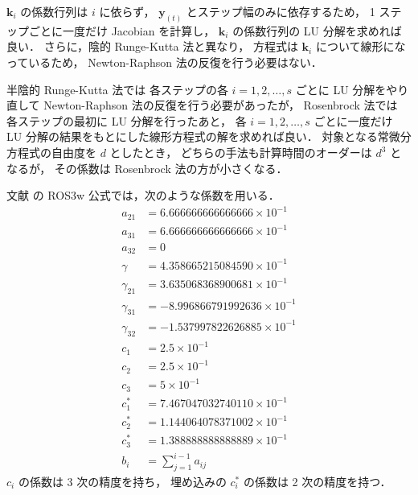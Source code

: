 $\bm{k}_i$ の係数行列は $i$ に依らず，
$\bm{y}_(t)$ とステップ幅のみに依存するため，
1 ステップごとに一度だけ Jacobian を計算し，
$\bm{k}_i$ の係数行列の LU 分解を求めれば良い．
さらに，陰的 Runge-Kutta 法と異なり，
方程式は $\bm{k}_i$ について線形になっているため，
Newton-Raphson 法の反復を行う必要はない．

半陰的 Runge-Kutta 法では
各ステップの各 $i = 1, 2, \ldots, s$ ごとに LU 分解をやり直して
Newton-Raphson 法の反復を行う必要があったが，
Rosenbrock 法では
各ステップの最初に LU 分解を行ったあと，
各 $i = 1, 2, \ldots, s$ ごとに一度だけ LU 分解の結果をもとにした線形方程式の解を求めれば良い．
対象となる常微分方程式の自由度を $d$ としたとき，
どちらの手法も計算時間のオーダーは $d^3$ となるが，
その係数は Rosenbrock 法の方が小さくなる．

文献 \cite{Rang2005} の ROS3w 公式では，次のような係数を用いる．
\begin{align}
    a_{21}      & = 6.666666666666666 \times 10^{-1}  \\
    a_{31}      & = 6.666666666666666 \times 10^{-1}  \\
    a_{32}      & = 0                                 \\
    \gamma      & = 4.358665215084590 \times 10^{-1}  \\
    \gamma_{21} & = 3.635068368900681 \times 10^{-1}  \\
    \gamma_{31} & = −8.996866791992636 \times 10^{-1} \\
    \gamma_{32} & = −1.537997822626885 \times 10^{-1} \\
    c_1         & = 2.5 \times 10^{-1}                \\
    c_2         & = 2.5 \times 10^{-1}                \\
    c_3         & = 5 \times 10^{-1}                  \\
    c_1^*       & = 7.467047032740110 \times 10^{-1}  \\
    c_2^*       & = 1.144064078371002 \times 10^{-1}  \\
    c_3^*       & = 1.388888888888889 \times 10^{-1}  \\
    b_i         & = \sum_{j = 1}^{i - 1} a_{ij}
\end{align}
$c_i$ の係数は 3 次の精度を持ち，
埋め込みの $c_i^*$ の係数は 2 次の精度を持つ．
